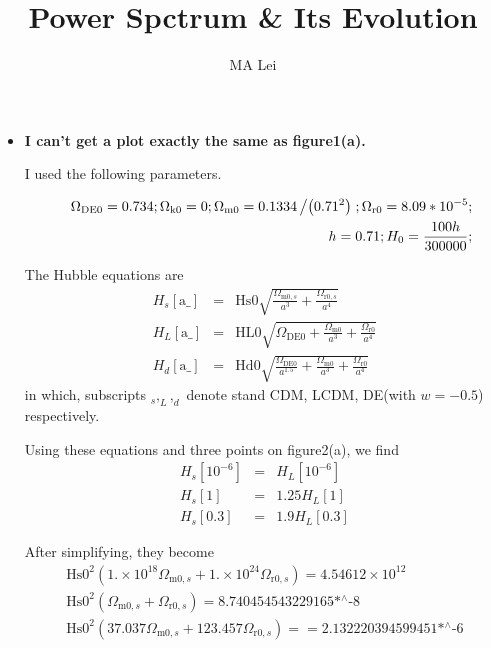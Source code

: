 \documentclass{article}
\begin{document}
\title{Power Spctrum \& Its Evolution}
\author{MA Lei}

\begin{itemize}

\item
{\bf I can't get a plot exactly the same as figure1(a).}

I used the following parameters.

\begin{eqnarray*}
&&\Omega _{\text{DE0}}=0.734;\Omega _{\text{k0}}=0;\Omega _{\text{m0}}=0.1334\left/\left(0.71^2\right)\right.;\Omega _{\text{r0}}=8.09*10^{-5};\\
&&h=0.71;H_0=\frac{100 h}{300000};
\end{eqnarray*}

The Hubble equations are
\begin{eqnarray}
H_s[\text{a$\_$}]&=&\text{Hs0} \sqrt{\frac{\Omega _{\text{m0},s}}{a^3}+\frac{\Omega _{\text{r0},s}}{a^4}}\\
H_L[\text{a$\_$}]&=&\text{HL0} \sqrt{\Omega _{\text{DE0}}+\frac{\Omega _{\text{m0}}}{a^3}+\frac{\Omega _{\text{r0}}}{a^4}}\\
H_d[\text{a$\_$}]&=&\text{Hd0} \sqrt{\frac{\Omega _{\text{DE0}}}{a^{1.5}}+\frac{\Omega _{\text{m0}}}{a^3}+\frac{\Omega _{\text{r0}}}{a^4}}
\end{eqnarray}
in which, subscripts $_s,_L,_d$ denote stand CDM, LCDM, DE(with $w=-0.5$) respectively.

Using these equations and three points on figure2(a), we find
\begin{eqnarray}
H_s\left[10^{-6}\right]&=&H_L\left[10^{-6}\right]\\
H_s[1]&=&1.25H_L[1]\\
H_s[0.3]&=&1.9H_L[0.3]
\end{eqnarray}

After simplifying, they become
\begin{eqnarray}
\text{Hs0}^2 \left(1.\times 10^{18} \Omega _{\text{m0},s}+1.\times 10^{24} \Omega _{\text{r0},s}\right)=4.54612\times 10^{12} \\
\text{Hs0}^2 \left(\Omega _{\text{m0},s}+\Omega _{\text{r0},s}\right)=\text{8.740454543229165$\grave{ }$*${}^{\wedge}$-8}\\
\text{Hs0}^2 \left(37.037 \Omega _{\text{m0},s}+123.457 \Omega _{\text{r0},s}\right)==\text{2.132220394599451$\grave{ }$*${}^{\wedge}$-6}
\end{eqnarray}


\end{itemize}
\end{document}
